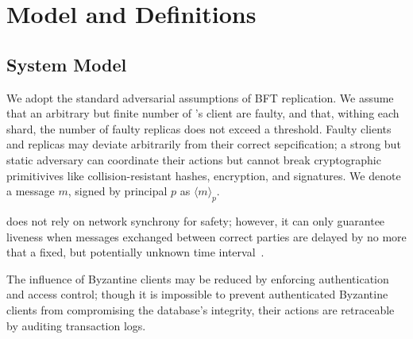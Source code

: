 \section{Model and Definitions}


\subsection{System Model}

We adopt the standard adversarial assumptions of BFT replication. We assume that an arbitrary but finite number of \sys's client are faulty, and that, withing each shard, the number of faulty replicas does not exceed a threshold. Faulty clients and replicas may  deviate arbitrarily from their correct sepcification;  a strong but static adversary can coordinate their actions but cannot  break cryptographic primitivives  like collision-resistant hashes, encryption, and signatures. We denote a message $m$, signed by principal $p$ as $\langle m \rangle_p$.

\sys{}  does not rely on network synchrony for safety; however, it can only guarantee liveness when messages exchanged between correct parties are delayed by no more that a fixed, but potentially unknown time interval~\cite{fischer1985impossibility}.


The influence of Byzantine clients may be reduced by enforcing authentication and access control; though it is impossible to prevent authenticated Byzantine clients from compromising the database's integrity, their actions are  retraceable by auditing transaction logs.
